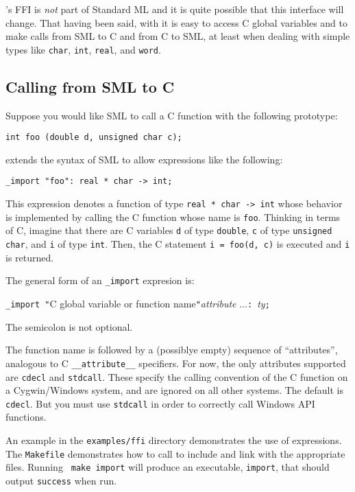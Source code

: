%
{\mlton}'s FFI is {\em not} part of Standard ML and it is quite
possible that this interface will change.  That having been said, with
{\mlton} it is easy to access C global variables and to make calls
from SML to C and from C to SML, at least when dealing with simple
types like {\tt char}, {\tt int}, {\tt real}, and {\tt word}.
%
\subsection{Calling from SML to C}

Suppose you would like SML to call a C function with the following
prototype:
\begin{verbatim}
int foo (double d, unsigned char c);
\end{verbatim}
{\mlton} extends the syntax of SML to allow expressions like the following:
\begin{verbatim}
_import "foo": real * char -> int;
\end{verbatim}
This expression denotes a function of type {\tt real * char -> int}
whose behavior is implemented by calling the C function whose name is
{\tt foo}.  Thinking in terms of C, imagine that there are C
variables {\tt d} of type {\tt double}, {\tt c} of type {\tt unsigned
char}, and {\tt i} of type {\tt int}.  Then, the C statement
\mbox{\tt i = foo(d, c)} is executed and {\tt i} is returned.

The general form of an \verb+_import+ expresion is:
\begin{center}
{\tt \_import "}C global variable or function name{\tt "}{\it attribute}
...{\tt : }{\it ty}{\tt ;}
\end{center}
The semicolon is not optional.

The function name is followed by a (possiblye empty) sequence of
``attributes'', analogous to C {\tt\_\_attribute\_\_} specifiers.  For
now, the only attributes supported are {\tt cdecl} and {\tt stdcall}.
These specify the calling convention of the C function on a
Cygwin/Windows system, and are ignored on all other systems.  The
default is {\tt cdecl}.  But you must use {\tt stdcall} in order to
correctly call Windows API functions.

An example in the {\tt examples/ffi} directory demonstrates the use of
{\ffi} expressions.  The {\tt Makefile} demonstrates how to call
{\mlton} to include and link with the appropriate files.  Running {\tt
make import} will produce an executable, {\tt import}, that should
output {\tt success} when run.

